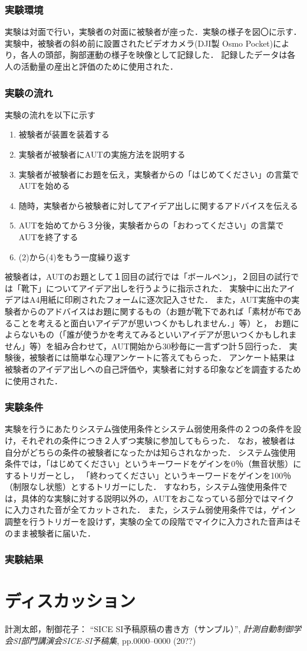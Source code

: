 \documentclass[a4paper]{jarticle}
\begin{document}
\subsubsection{実験環境}
実験は対面で行い，実験者の対面に被験者が座った．実験の様子を図〇に示す．
実験中，被験者の斜め前に設置されたビデオカメラ(DJI製 Osmo Pocket)により，各人の頭部，胸部運動の様子を映像として記録した．
記録したデータは各人の活動量の産出と評価のために使用された．

\subsubsection{実験の流れ}
実験の流れを以下に示す
\begin{enumerate}
    \item 被験者が装置を装着する
    \item 実験者が被験者にAUTの実施方法を説明する
    \item 実験者が被験者にお題を伝え，実験者からの「はじめてください」の言葉でAUTを始める
    \item 随時，実験者から被験者に対してアイデア出しに関するアドバイスを伝える
    \item AUTを始めてから３分後，実験者からの「おわってください」の言葉でAUTを終了する
    \item (2)から(4)をもう一度繰り返す
\end{enumerate}
被験者は，AUTのお題として１回目の試行では「ボールペン」，２回目の試行では「靴下」についてアイデア出しを行うように指示された．
実験中に出たアイデアはA4用紙に印刷されたフォームに逐次記入させた．
また，AUT実施中の実験者からのアドバイスはお題に関するもの（お題が靴下であれば「素材が布であることを考えると面白いアイデアが思いつくかもしれません．」等）と，
お題によらないもの（「誰が使うかを考えてみるといいアイデアが思いつくかもしれません」等）を組み合わせて，AUT開始から30秒毎に一言ずつ計５回行った．
実験後，被験者には簡単な心理アンケートに答えてもらった．
アンケート結果は被験者のアイデア出しへの自己評価や，実験者に対する印象などを調査するために使用された．

\subsubsection{実験条件}
実験を行うにあたりシステム強使用条件とシステム弱使用条件の２つの条件を設け，それぞれの条件につき２人ずつ実験に参加してもらった．
なお，被験者は自分がどちらの条件の被験者になったかは知らされなかった．
システム強使用条件では，「はじめてください」というキーワードをゲインを0％（無音状態）にするトリガーとし，
「終わってください」というキーワードをゲインを100％（制限なし状態）とするトリガーにした．
すなわち，システム強使用条件では，具体的な実験に対する説明以外の，AUTをおこなっている部分ではマイクに入力された音が全てカットされた．
また，システム弱使用条件では，ゲイン調整を行うトリガーを設けず，実験の全ての段階でマイクに入力された音声はそのまま被験者に届いた．

\subsubsection{実験結果}
\section{ディスカッション}
%
%
\begin{thebibliography}{99}
	計測太郎，制御花子：
	``SICE SI予稿原稿の書き方（サンプル）'',  
   {\it 計測自動制御学会SI部門講演会SICE-SI予稿集}, 
    pp.0000--0000 (20??)
\end{thebibliography}
%
%
%
\end{document}
